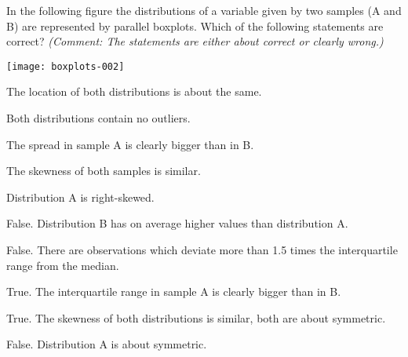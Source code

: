 
\begin{question}
In the following figure the distributions of a variable
given by two samples (A and B) are represented by parallel boxplots.
Which of the following statements are correct?  \emph{(Comment: The
statements are either about correct or clearly wrong.)}

\texttt{[image: boxplots-002]}

\begin{answerlist}
  \item The location of both distributions is about the same.
  \item Both distributions contain no outliers.
  \item The spread in sample A is clearly bigger than in B.
  \item The skewness of both samples is similar.
  \item Distribution A is right-skewed.
\end{answerlist}
\end{question}

\begin{solution}
\begin{answerlist}
  \item False. Distribution B has on average higher values than distribution A.
  \item False. There are observations which deviate more than 1.5 times the interquartile range from the median.
  \item True. The interquartile range in sample A is  clearly bigger than in B.
  \item True. The skewness of both distributions is similar, both are about symmetric.
  \item False. Distribution  A  is  about symmetric.
\end{answerlist}
\end{solution}

